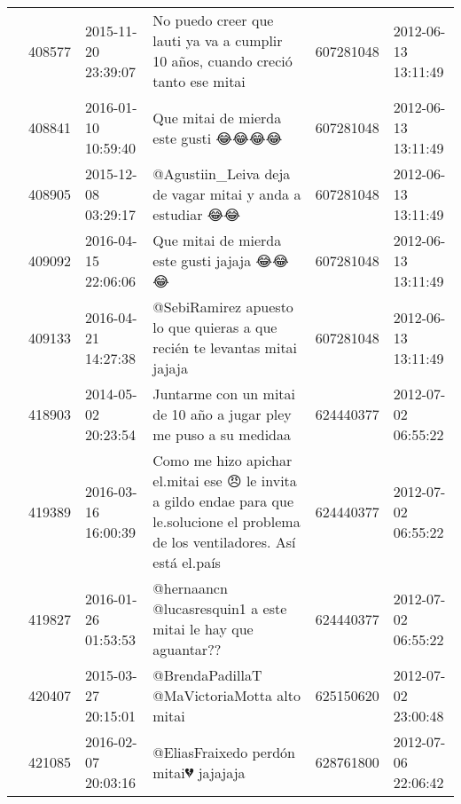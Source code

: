 \begin{tabular}{llllrl}
           & 408577  & 2015-11-20 23:39:07 &                                                              No puedo creer que lauti ya va a cumplir 10 años, cuando creció tanto ese mitai &   607281048 & 2012-06-13 13:11:49 \\
           & 408841  & 2016-01-10 10:59:40 &                                                                                                          Que mitai de mierda este gusti 😂😂😂😂 &   607281048 & 2012-06-13 13:11:49 \\
           & 408905  & 2015-12-08 03:29:17 &                                                                                     @Agustiin\_Leiva deja de vagar mitai y anda a estudiar 😂😂 &   607281048 & 2012-06-13 13:11:49 \\
           & 409092  & 2016-04-15 22:06:06 &                                                                                                    Que mitai de mierda este gusti jajaja 😂😂😂 &   607281048 & 2012-06-13 13:11:49 \\
           & 409133  & 2016-04-21 14:27:38 &                                                                    @SebiRamirez apuesto lo que quieras a que recién te levantas mitai jajaja &   607281048 & 2012-06-13 13:11:49 \\
           & 418903  & 2014-05-02 20:23:54 &                                                                            Juntarme con un mitai de 10 año a jugar pley me puso a su medidaa &   624440377 & 2012-07-02 06:55:22 \\
           & 419389  & 2016-03-16 16:00:39 &          Como me hizo apichar el.mitai ese 😠 le invita a gildo endae para que le.solucione el problema de los ventiladores. Así está el.país &   624440377 & 2012-07-02 06:55:22 \\
           & 419827  & 2016-01-26 01:53:53 &                                                                                 @hernaancn @lucasresquin1 a este mitai le hay que aguantar?? &   624440377 & 2012-07-02 06:55:22 \\
           & 420407  & 2015-03-27 20:15:01 &                                                                                                  @BrendaPadillaT @MaVictoriaMotta alto mitai &   625150620 & 2012-07-02 23:00:48 \\
           & 421085  & 2016-02-07 20:03:16 &                                                                                                        @EliasFraixedo perdón mitai💔 jajajaja &   628761800 & 2012-07-06 22:06:42 \\

\end{tabular}
